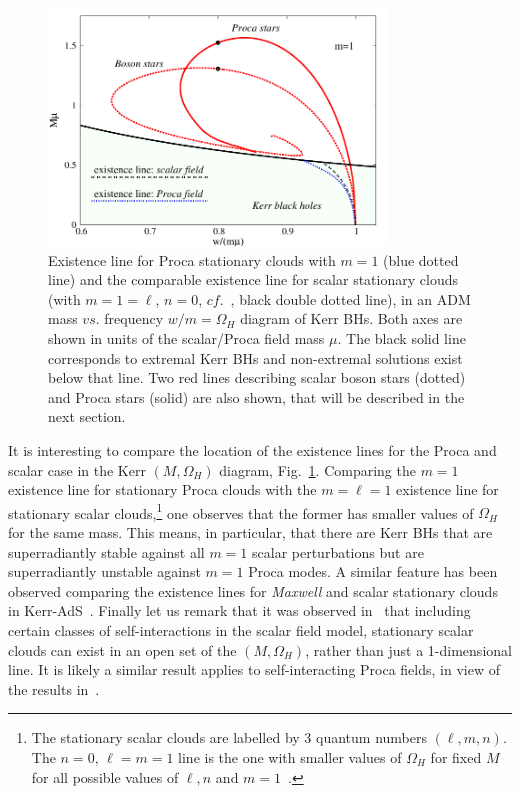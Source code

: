 \begin{figure}[h!]
  \begin{center}
    \includegraphics[width=9.0cm]{papers/Proca/wM-m1-comparison.pdf}
  \end{center}
 \caption{Existence line for Proca stationary clouds with $m=1$ (blue dotted line) and the comparable existence line for scalar stationary clouds (with $m=1=\ell$, $n=0$, $cf.$~\cite{Benone:2014ssa}, black double dotted line), in an ADM mass $vs.$ frequency $w/m=\Omega_H$ diagram of Kerr BHs. Both axes are shown in units of the scalar/Proca field mass $\mu$. The black solid line corresponds to extremal Kerr BHs and non-extremal solutions exist below that line. Two red lines describing scalar boson stars (dotted) and Proca stars (solid) are also shown, that will be described in the next section.}
  \label{clouds}
\end{figure}

It is interesting to compare the location of the existence lines for the Proca and scalar case in the Kerr $(M,\Omega_H)$ diagram, Fig.~\ref{clouds}. Comparing the $m=1$ existence line for stationary Proca clouds with the $m=\ell=1$ existence line for stationary scalar clouds,\footnote{The stationary scalar clouds are labelled by 3 quantum numbers $(\ell,m,n)$. The $n=0$, $\ell=m=1$ line is the one with smaller values of $\Omega_H$ for fixed $M$ for all possible values of $\ell,n$ and $m=1$~\cite{Benone:2014ssa}.} one observes that the former has smaller values of $\Omega_H$ for the same mass. This means, in particular, that there are Kerr BHs that are superradiantly stable against all $m=1$ scalar perturbations but are superradiantly unstable against $m=1$ Proca modes. A similar feature has been observed comparing the existence lines for \textit{Maxwell} and scalar stationary clouds in Kerr-AdS~\cite{Wang:2015fgp}. Finally let us remark that it was observed in~\cite{Herdeiro:2014pka} that including certain classes of self-interactions in the scalar field model, stationary scalar clouds can exist in an open set of the $(M,\Omega_H)$, rather than just a 1-dimensional line.  It is likely a similar result applies to self-interacting Proca fields, in view of the results in~\cite{Loginov:2015rya}.




